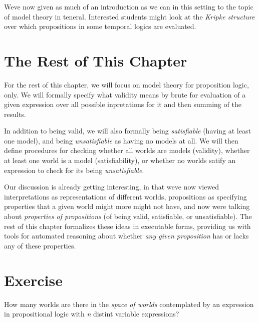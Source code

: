 \documentclass{book}
\begin{document}
We\textquotesingle ve now given as much of an introduction as we
can in this setting to the topic of model theory
in teneral. Interested students might look at the
\emph{Kripke structure} over which propositions in some
temporal logics are evaluated.

\hypertarget{pandoc.profile.debug__pandoc__debug__src__modeltheory.md__the-rest-of-this-chapter}{%
\section*{The Rest of This Chapter}\label{pandoc.profile.debug__pandoc__debug__src__modeltheory.md__the-rest-of-this-chapter}}

For the rest of this chapter, we will focus on model theory for proposition logic, only. We will formally specify what validity means by brute for evaluation of a given expression over all possible inpretations for
it and then summing of the results.

In addition to being valid, we will also formally being \emph{satisfiable} (having at least one model), and being \emph{unsatisfiable} as having no models at all. We will then define procedures for checking whether all worlds are models (validity), whether at least one world is a model (satisfiability), or whether no worlds satify an expression to check for its being \emph{unsatisfiable}.

Our discussion is already getting interesting, in that
we\textquotesingle ve now viewed interpretations as representations of different worlds, propositions as specifying properties that a given world might more might not have, and now we\textquotesingle re talking about \emph{properties of propositions} (of being valid, satisfiable, or unsatisfiable). The rest of this chapter formalizes these ideas in executable forms, providing us with tools for automated reasoning about whether \emph{any given proposition} has or lacks any of these properties.

\hypertarget{pandoc.profile.debug__pandoc__debug__src__modeltheory.md__exercise}{%
\section*{Exercise}\label{pandoc.profile.debug__pandoc__debug__src__modeltheory.md__exercise}}

How many worlds are there in the \emph{space of worlds}
contemplated by an expression in propositional logic
with \emph{n} distint variable expressions?
\end{document}
